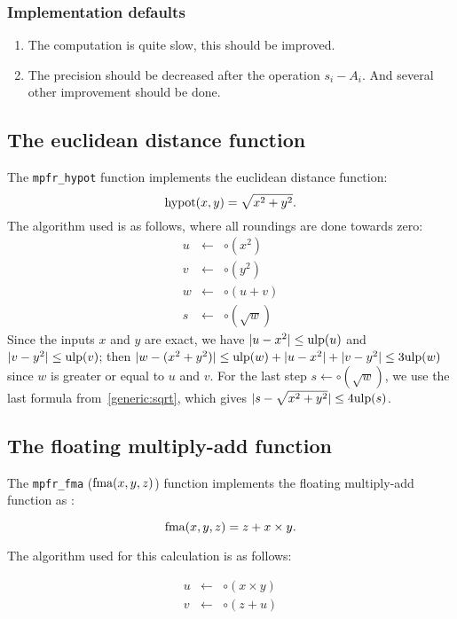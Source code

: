 \documentclass[12pt]{amsart}
\def\n{\textnormal}
\def\ulp{{\rm ulp}}
\begin{document}
\subsubsection{Implementation defaults}
\begin{enumerate}
\item The computation is quite slow, this should be improved.
\item The precision should be decreased after the operation $s_i-A_i$. And several other improvement should be done.
\end{enumerate}

\subsection{The euclidean distance function}

The \texttt{mpfr\_hypot} function implements the euclidean distance function:
\[
\textnormal{hypot} (x,y) = \sqrt{x^2+y^2}.
\]
The algorithm used is as follows, where all roundings are done towards zero:
\begin{eqnarray}\nonumber
u&\leftarrow&\circ(x^2)\\\nonumber
v&\leftarrow&\circ(y^2)\\\nonumber
w&\leftarrow&\circ(u+v)\\\nonumber
s&\leftarrow&\circ(\sqrt{w})
\end{eqnarray}
Since the inputs $x$ and $y$ are exact, we have $|u-x^2| \leq \ulp(u)$
and $|v-y^2| \leq \ulp(v)$;
then $|w-(x^2+y^2)| \leq \ulp(w) + |u-x^2| + |v-y^2| \leq 3 \ulp(w)$
since $w$ is greater or equal to $u$ and $v$.
For the last step $s \leftarrow \circ(\sqrt{w})$, we use the last formula
from~\textsection\ref{generic:sqrt}, which gives
$|s-\sqrt{x^2+y^2}| \leq 4 \ulp(s)$.

\subsection{The floating multiply-add function}

The {\tt mpfr\_fma} ($\n{fma}(x,y,z)$) function implements the floating multiply-add function  as :

\[
\textnormal{fma} (x,y,z) = z + x \times y.
\]

The algorithm used for this calculation is as follows:

\begin{eqnarray}\nonumber
u&\leftarrow&\circ(x \times y)\\\nonumber
v&\leftarrow&\circ(z + u)\\\nonumber
\end{eqnarray}
\end{document}
